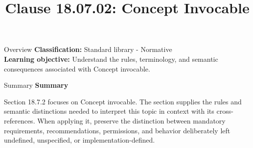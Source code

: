 \documentclass[10pt,letterpaper]{article}
\title{Clause 18.07.02: Concept Invocable}
\author{}
\date{}
\begin{document}
\maketitle
\begin{CornellOverviewBox}{Overview}
\textbf{Classification:} Standard library - Normative\\[2pt]
\textbf{Learning objective:} Understand the rules, terminology, and semantic consequences associated with Concept invocable.
\end{CornellOverviewBox}\begin{CornellSummaryBox}{Summary}
{\sffamily\bfseries\color{Accent} Summary}\par\vspace{3pt}Section 18.7.2 focuses on Concept invocable. The section supplies the rules and semantic distinctions needed to interpret this topic in context with its cross-references. When applying it, preserve the distinction between mandatory requirements, recommendations, permissions, and behavior deliberately left undefined, unspecified, or implementation-defined.
\end{CornellSummaryBox}
\end{document}
